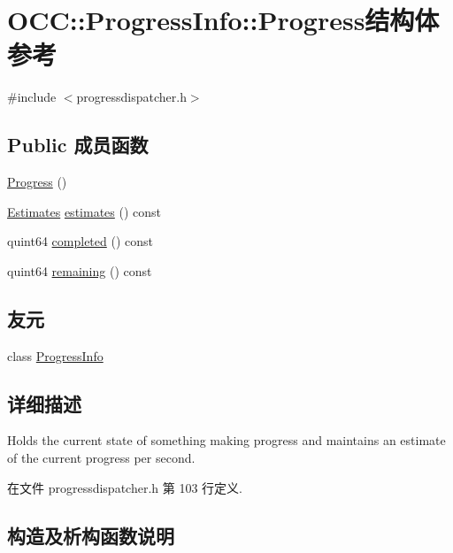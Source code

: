 \hypertarget{struct_o_c_c_1_1_progress_info_1_1_progress}{}\section{O\+CC\+:\+:Progress\+Info\+:\+:Progress结构体 参考}
\label{struct_o_c_c_1_1_progress_info_1_1_progress}


{\ttfamily \#include $<$progressdispatcher.\+h$>$}

\subsection*{Public 成员函数}
\begin{DoxyCompactItemize}
\item 
\hyperlink{struct_o_c_c_1_1_progress_info_1_1_progress_a88efb02ee28aef4b1124e246df7170e4}{Progress} ()
\item 
\hyperlink{struct_o_c_c_1_1_progress_info_1_1_estimates}{Estimates} \hyperlink{struct_o_c_c_1_1_progress_info_1_1_progress_af08d5c60250a1db3c81bcd7cc87b8302}{estimates} () const
\item 
quint64 \hyperlink{struct_o_c_c_1_1_progress_info_1_1_progress_a9565761ed6d6f5d0aa3e7860860add9a}{completed} () const
\item 
quint64 \hyperlink{struct_o_c_c_1_1_progress_info_1_1_progress_af016f32a2745121bd670f4ccfe0634da}{remaining} () const
\end{DoxyCompactItemize}
\subsection*{友元}
\begin{DoxyCompactItemize}
\item 
class \hyperlink{struct_o_c_c_1_1_progress_info_1_1_progress_a51d41a36b682a90c6cdabc1facdf78fa}{Progress\+Info}
\end{DoxyCompactItemize}


\subsection{详细描述}
Holds the current state of something making progress and maintains an estimate of the current progress per second. 

在文件 progressdispatcher.\+h 第 103 行定义.



\subsection{构造及析构函数说明}
\mbox{\label{struct_o_c_c_1_1_progress_info_1_1_progress_a88efb02ee28aef4b1124e246df7170e4}} 
